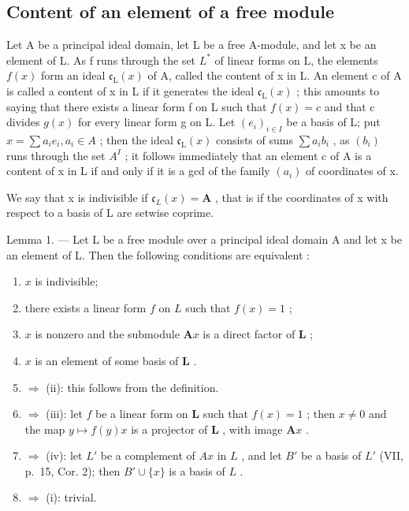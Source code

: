 \subsection{Content of an element of a free module}

Let A be a principal ideal domain, let L be a free A-module, and let x be an element of L. As f runs through the set \(L^{*}\) of linear forms on L, the elements \(f(x)\) form an ideal \(\mathfrak{c}_{\mathrm{L}}(x)\) of A, called the content of x in L. An element c of A is called a content of x in L if it generates the ideal \(\mathfrak{c}_{\mathrm{L}}(x)\) ; this amounts to saying that there exists a linear form f on L such that \(f(x)=c\) and that c divides \(g(x)\) for every linear form g on L. Let \((e_{i})_{i\in I}\) be a basis of L; put \(x=\sum a_{i}e_{i}, a_{i}\in A\) ; then the ideal \(\mathfrak{c}_{\mathrm{L}}(x)\) consists of sums \(\sum a_{i}b_{i}\) , as \((b_{i})\) runs through the set \(A^{I}\) ; it follows immediately that an element c of A is a content of x in L if and only if it is a gcd of the family \((a_{i})\) of coordinates of x.

We say that x is indivisible if \(\mathfrak{c}_{L}(x)=\mathbf{A}\) , that is if the coordinates of x with respect to a basis of L are setwise coprime.

Lemma 1. --- Let L be a free module over a principal ideal domain A and let x be an element of L. Then the following conditions are equivalent :

\begin{enumerate}
\def\labelenumi{(\roman{enumi})}
\item
  \(x\) is indivisible;
\item
  there exists a linear form \(f\) on \(L\) such that \(f(x) = 1\) ;
\item
  \(x\) is nonzero and the submodule \(\mathbf{A}x\) is a direct factor of \(\mathbf{L}\) ;
\item
  \(x\) is an element of some basis of \(\mathbf{L}\) .
\item
  \(\Rightarrow\) (ii): this follows from the definition.
\item
  \(\Rightarrow\) (iii): let \(f\) be a linear form on \(\mathbf{L}\) such that \(f(x) = 1\) ; then \(x \neq 0\) and the map \(y \mapsto f(y)x\) is a projector of \(\mathbf{L}\) , with image \(\mathbf{A}x\) .
\item
  \(\Rightarrow\) (iv): let \(L'\) be a complement of \(Ax\) in \(L\) , and let \(B'\) be a basis of \(L'\) (VII, p.~15, Cor. 2); then \(B' \cup \{x\}\) is a basis of \(L\) .
\item
  \(\Rightarrow\) (i): trivial.
\end{enumerate}

